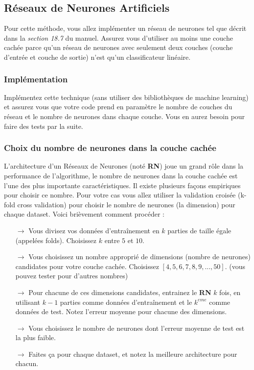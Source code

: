 \documentclass[latter,12pt]{article}
\begin{document}
 
 
 
 
 
 
 
 
 
 
 
 
 
\subsection{Réseaux de Neurones Artificiels}
Pour cette méthode, vous allez implémenter un réseau de neurones tel que décrit dans la \emph{section 18.7} du manuel. Assurez vous d'utiliser au moins une couche cachée parce qu'un réseau de neurones avec seulement deux couches (couche d'entrée et couche de sortie) n'est qu'un classificateur linéaire.


\subsubsection{Implémentation}
Implémentez cette technique (sans utiliser des bibliothèques de machine learning) et assurez vous que votre code prend en paramètre le nombre de couches du réseau et le nombre de neurones dans chaque couche. Vous en aurez besoin pour faire des tests par la suite.

\subsubsection{Choix du nombre de neurones dans la couche cachée}
\label{222}
L'architecture d'un Réseaux de Neurones (noté {\bf RN}) joue un grand rôle dans la performance de l'algorithme, le nombre de neurones dans la couche cachée est l'une des plus importante caractéristiques. Il existe plusieurs façons empiriques pour choisir ce nombre. Pour votre cas vous allez utiliser la validation croisée (k-fold cross validation) pour choisir le nombre de neurones (la dimension) pour chaque dataset. Voici brièvement comment procéder :

\begin{itemize}
\item [$\rightarrow$] Vous divisez vos données d'entraînement en $k$ parties de taille égale (appelées folds). Choisissez $k$ entre $5$ et $10$.

\item[$\rightarrow$] Vous choisissez un nombre approprié de dimensions (nombre de neurones) candidates pour votre couche cachée. Choisissez $[4,5,6,7,8,9,...,50]$. (vous pouvez tester pour d'autres nombres)

\item[$\rightarrow$] Pour chacune de ces dimensions candidates, entrainez le \textbf{RN} $k$ fois, en utilisant $k-1$ parties comme données d'entraînement et le $k^{eme}$ comme données de test. Notez l'erreur moyenne pour chacune des dimensions.

\item[$\rightarrow$] Vous choisissez le nombre de neurones dont l'erreur moyenne de test est la plus faible.

\item[$\rightarrow$] Faites ça pour chaque dataset, et notez la meilleure architecture pour chacun.
\end{itemize}
\end{document}
